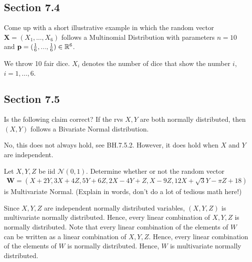 \subsection*{Section 7.4}
\label{sec:section-7.4}

\begin{exercise}
Come up with a short illustrative example in which the random vector $\mathbf{X} = (X_1, \ldots, X_6)$ follows a Multinomial Distribution with parameters  $n=10$ and $\mathbf{p}=(\frac{1}{6}, ..., \frac{1}{6}) \in \mathbb{R}^{6}$.
\begin{solution}
We throw 10 fair dice. $X_i$ denotes the number of dice that show the number $i$, $i=1,\ldots,6$.
\end{solution}
\end{exercise}


\subsection*{Section 7.5}



\begin{exercise}
Is the following claim correct? If the rvs $X, Y$ are both normally distributed, then $(X, Y)$ follows a Bivariate Normal distribution.
\begin{solution}
No, this does not always hold, see BH.7.5.2. However, it does hold when $X$ and $Y$ are independent.
\end{solution}
\end{exercise}
\begin{exercise}
Let $X, Y, Z$ be iid $\mathcal{N}(0,1).$ Determine whether or not the random vector
\begin{align*}
    \mathbf{W} = (X+2Y, 3X+4Z, 5Y+6Z, 2X-4Y+Z, X-9Z, 12X+\sqrt{3}Y -\pi Z + 18)
\end{align*}
is Multivariate Normal. (Explain in words, don't do a lot of tedious math here!)
\begin{solution}
Since $X,Y,Z$ are independent normally distributed variables, $(X,Y,Z)$ is multivariate normally distributed. Hence, every linear combination of $X,Y,Z$ is normally distributed. Note that every linear combination of the elements of $W$ can be written as a linear combination of $X,Y,Z$. Hence, every linear combination of the elements of $W$ is normally distributed. Hence, $W$ is multivariate normally distributed.
\end{solution}
\end{exercise}


